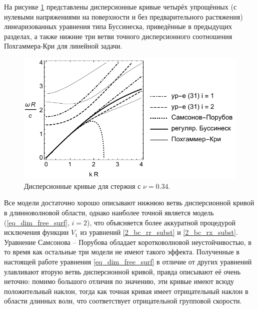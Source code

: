 \documentclass[12pt, a4paper]{article}
\begin{document}
На рисунке \ref{fig:disp} представлены дисперсионные кривые четырёх упрощённых (с нулевыми напряжениями на поверхности и без предварительного растяжения) линеаризованных уравнения типа Буссинеска, приведённые в предыдущих разделах, а также нижние три ветви точного дисперсионного соотношения Похгаммера-Кри для линейной задачи.
\begin{figure}[h]
	\centering
	\includegraphics[width=0.65\linewidth]{2_DispBlackSmall}
	\caption{Дисперсионные кривые для стержня с $\nu = 0.34$.}
	\label{fig:disp}
	\vspace{-2mm}
\end{figure} 

Все модели достаточно хорошо описывают нижнюю ветвь дисперсионной кривой в длинноволновой области, однако наиболее точной является модель (\ref{eq_dim_free_surf}, $i=2$), что объясняется более аккуратной процедурой исключения функции $V_1$ из уравнений \eqref{2_bc_rr_subst} и \eqref{2_bc_rx_subst}. Уравнение Самсонова -- Порубова обладает коротковолновой неустойчивостью, в то время как остальные три модели не имеют такого эффекта. 
Полученные в настоящей работе уравнения \eqref{eq_dim_free_surf} в отличие от других уравнений улавливают вторую ветвь дисперсионной кривой, правда описывают её очень неточно: помимо большого отличия по значению, эти кривые имеют всюду положительный наклон, тогда как точная кривая имеет отрицательный наклон в области длинных волн, что соответствует отрицательной групповой скорости.
\end{document}
